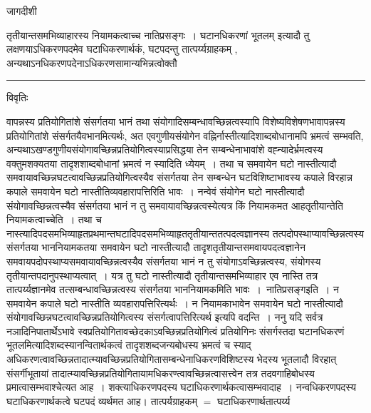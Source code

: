 \documentclass[10pt, openany]{book}
\begin{document}
{\newpage
\begin{center} जागदीशी \end{center}
{\la तृतीयान्तसमभिव्याहारस्य नियामकत्वाच्च नातिप्रसङ्गः~। {\qt घटानधिकरणां भूतलम्} इत्यादौ तु लक्षणयाऽधिकरणपदमेव घटाधिकरणार्थकं, घटपदन्तु तात्पर्य्यग्राहकम् , अन्यथाऽनधिकरणपदेनाऽधिकरणसामान्यभिन्नत्वोक्तौ}\\
\hrule
\begin{center}     विवृतिः \end{center}
वापन्नस्य प्रतियोगितांशे संसर्गतया भानं तथा संयोगादिसम्बन्धावच्छिन्नत्वस्यापि विशेष्यविशेषणभावापन्नस्य प्रतियोगितांशे संसर्गतयैवभानमित्यर्थः, अत एवगुणीयसंयोगेन वह्निर्नास्तीत्यादिशाब्दबोधानामपि भ्रमत्वं सम्भवति, अन्यथाऽखण्डगुणीयसंयोगावच्छिन्नप्रतियोगित्वस्याप्रसिद्धया तेन सम्बन्धेनाभावांशे वह्न्यादेर्भ्रमत्वस्य वक्तुमशक्यतया तादृशशाब्दबोधानां भ्रमत्वं न स्यादिति ध्येयम्~। तथा च समवायेन घटो नास्तीत्यादौ समवायावच्छिन्नघटत्वावच्छिन्नप्रतियोगित्वस्यैव संसर्गतया तेन सम्बन्धेन घटविशिष्टाभावस्य कपाले विरहान्न कपाले समवायेन घटो नास्तीतिव्यवहारापत्तिरिति भावः~। नन्वेवं संयोगेन घटो नास्तीत्यादौ संयोगावच्छिन्नत्वस्यैव संसर्गतया भानं न तु समवायावच्छिन्नत्वस्येत्यत्र किं नियामकमत आह\textendash  तृतीयान्तेति नियामकत्वाच्चेति~। तथा च नास्त्यादिपदसमभिव्याहृतप्रथमान्तघटादिपदसमभिव्याहृततृतीयान्ततत्पदत्वज्ञानस्य तत्पदोपस्थाप्यावच्छिन्नत्वस्य संसर्गतया भाननियामकतया समवायेन घटो नास्तीत्यादौ तादृशतृतीयान्तसमवायपदत्वज्ञानेन समवायपदोपस्थाप्यसमवायावच्छिन्नत्वस्यैव संसर्गतया भानं न तु संयोगाऽवच्छिन्नत्वस्य, संयोगस्य तृतीयान्तपदानुपस्थाप्यत्वात्~। यत्र तु घटो
नास्तीत्यादौ तृतीयान्तसमभिव्याहार एव नास्ति तत्र तात्पर्य्यज्ञानमेव
तत्सम्बन्धावच्छिन्नत्वस्य संसर्गतया भाननियामकमिति भावः~।~{\la नातिप्रसङ्गइति~।} न समवायेन कपाले घटो नास्तीति व्यवहारापत्तिरित्यर्थः~। न नियामकाभावेन
समवायेन घटो नास्तीत्यादौ संयोगावच्छिन्नघटत्वावच्छिन्नप्रतियोगित्वस्य
संसर्गत्वापत्तिरित्यर्थ इत्यपि वदन्ति~। ननु यदि सर्वत्र नञादिनिपातार्थेऽभावे
स्वप्रतियोगितावच्छेदकाऽवच्छिन्नप्रतियोगित्वं प्रतियोगिनः संसर्गस्तदा घटानधिकरणं
भूतलमित्यादिशब्दस्यानन्वितार्थकत्वं तादृशशब्दजन्यबोधस्य भ्रमत्वं च
स्याद् अधिकरणत्वावच्छिन्नतादात्म्यावच्छिन्नप्रतियोगितासम्बन्धेनाधिकरणविशिष्टस्य
भेदस्य भूतलादौ विरहात् संसर्गीभूतायां तादात्म्यावच्छिन्नप्रतियोगितायामधिकरण्त्वावच्छिन्नत्वासत्त्वेन तत्र तदवगाहिबोधस्य
प्रमात्वासम्भवाश्चेत्यत
आह~। शक्त्याधिकरणपदस्य घटाधिकरणार्थकत्वासम्भवादाह~। नन्वधिकरणपदस्य घटाधिकरणार्थकत्वे घटपदं
व्यर्थमत आह। तात्पर्यग्राहकम् $=$ घटाधिकरणार्थतात्पर्य्य
\newpage
}
\end{document}
